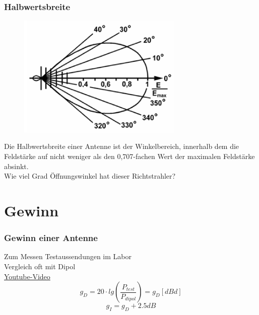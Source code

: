 \begin{frame}
  \frametitle{Halbwertsbreite}
  \begin{center}
    \begin{figure}
      \includegraphics[width=0.7\textwidth,height=.75\textheight,keepaspectratio]{a09/TH213.png}
    \end{figure}
    \large Die Halbwertsbreite einer Antenne ist der Winkelbereich, innerhalb dem
    die Feldstärke auf nicht weniger als den 0,707-fachen Wert der maximalen Feldstärke absinkt.\\[1em] Wie viel Grad Öffnungswinkel hat dieser Richtstrahler?
  \end{center}
\end{frame}

\section*{Gewinn}

\begin{frame}
  \frametitle{Gewinn einer Antenne}
  \begin{center}
    \large Zum Messen Testaussendungen im Labor\\
    Vergleich oft mit Dipol\\
    \href{https://www.youtube.com/watch?v=gBqqp7rnZ64}{\ExternalLink Youtube-Video}\\[2em]
    $$g_D = 20 \cdot lg(\frac{P_{test}}{P_{dipol}}) = g_D[dBd]$$
    $$g_I = g_D + 2.5dB$$
  \end{center}
\end{frame}

